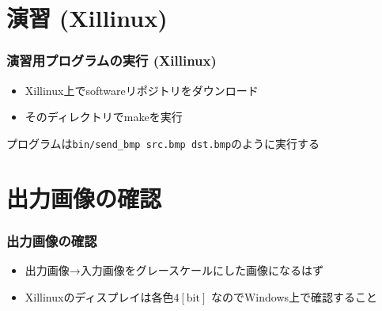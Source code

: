 ﻿\documentclass[dvipdfmx]{beamer}
\begin{document}
\section{演習 (Xillinux)}
\begin{frame}[fragile]
	\frametitle{演習用プログラムの実行 (Xillinux)}
	\begin{itemize}
		\item
			Xillinux上でsoftwareリポジトリをダウンロード
		\item
			そのディレクトリでmakeを実行
	\end{itemize}
	プログラムは\verb|bin/send_bmp src.bmp dst.bmp|のように実行する
\end{frame}

\section{出力画像の確認}
\begin{frame}
	\frametitle{出力画像の確認}
	\begin{itemize}
		\item
			出力画像→入力画像をグレースケールにした画像になるはず
			\vfill
		\item
			Xillinuxのディスプレイは各色$4\mathrm{[bit]}$
			なのでWindows上で確認すること
	\end{itemize}
\end{frame}
\end{document}
